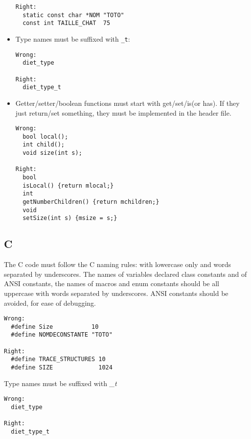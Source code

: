 \documentclass{article}
\begin{document}
\begin{itemize}
\begin{verbatim}
Right:
  static const char *NOM "TOTO"
  const int TAILLE_CHAT  75
\end{verbatim}

\item Type names must be suffixed with \texttt{\_t}: \\
\begin{verbatim}
Wrong:
  diet_type

Right:
  diet_type_t
\end{verbatim}
\item Getter/setter/boolean functions must start with get/set/is(or has).
If they just return/set something, they must be implemented in the header
file.
\begin{verbatim}
Wrong:
  bool local();
  int child();
  void size(int s);

Right:
  bool 
  isLocal() {return mlocal;} 
  int  
  getNumberChildren() {return mchildren;}
  void 
  setSize(int s) {msize = s;}
\end{verbatim}

\end{itemize}

\subsection{C}
The C code must follow the C naming rules:
 with lowercase only and words separated by underscores.
The names of variables declared class constants and of ANSI constants,
 the names of macros and enum constants should be all uppercase with words
 separated by underscores. ANSI constants should be avoided, for ease of
 debugging.
\begin{verbatim}
Wrong:
  #define Size           10
  #define NOMDECONSTANTE "TOTO"

Right:
  #define TRACE_STRUCTURES 10
  #define SIZE             1024
\end{verbatim}

Type names must be suffixed with \textit{\_t}
\begin{verbatim}
Wrong:
  diet_type

Right:
  diet_type_t
\end{verbatim}
\end{document}
